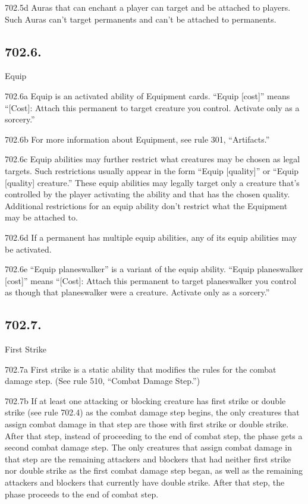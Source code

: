 702.5d Auras that can enchant a player can target and be attached to players. Such Auras can’t target permanents and can’t be attached to permanents.

\subsection*{702.6.}
Equip

702.6a Equip is an activated ability of Equipment cards. “Equip [cost]” means “[Cost]: Attach this permanent to target creature you control. Activate only as a sorcery.”

702.6b For more information about Equipment, see rule 301, “Artifacts.”

702.6c Equip abilities may further restrict what creatures may be chosen as legal targets. Such restrictions usually appear in the form “Equip [quality]” or “Equip [quality] creature.” These equip abilities may legally target only a creature that’s controlled by the player activating the ability and that has the chosen quality. Additional restrictions for an equip ability don’t restrict what the Equipment may be attached to.

702.6d If a permanent has multiple equip abilities, any of its equip abilities may be activated.

702.6e “Equip planeswalker” is a variant of the equip ability. “Equip planeswalker [cost]” means “[Cost]: Attach this permanent to target planeswalker you control as though that planeswalker were a creature. Activate only as a sorcery.”

\subsection*{702.7.}
First Strike

702.7a First strike is a static ability that modifies the rules for the combat damage step. (See rule 510, “Combat Damage Step.”)

702.7b If at least one attacking or blocking creature has first strike or double strike (see rule 702.4) as the combat damage step begins, the only creatures that assign combat damage in that step are those with first strike or double strike. After that step, instead of proceeding to the end of combat step, the phase gets a second combat damage step. The only creatures that assign combat damage in that step are the remaining attackers and blockers that had neither first strike nor double strike as the first combat damage step began, as well as the remaining attackers and blockers that currently have double strike. After that step, the phase proceeds to the end of combat step.

